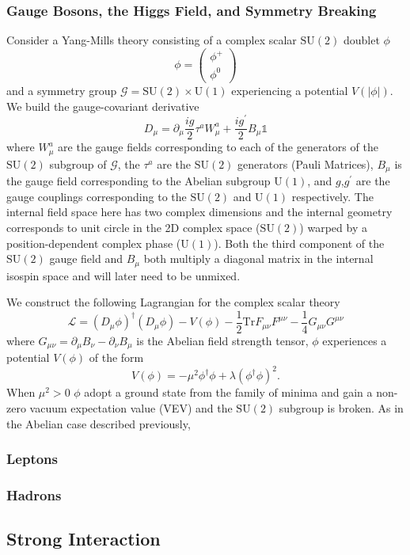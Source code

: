 \subsubsection{Gauge Bosons, the Higgs Field, and Symmetry Breaking}
Consider a Yang-Mills theory consisting of a complex scalar $\mathrm{SU}(2)$ doublet $\phi$ 
\begin{equation}
    \label{eq:theory:higgs_doublet}
    \phi = \begin{pmatrix}
        \phi^{+} \\
        \phi^{0}
    \end{pmatrix}
\end{equation}
and a symmetry group $\mathcal{G}=\mathrm{SU}(2)\times\mathrm{U}(1)$ experiencing a potential $V(|\phi|)$. We build the gauge-covariant derivative 
\begin{equation}
    \label{eq:theory:electroweak_cov_deriv}
    D_{\mu} = \partial_{\mu} \frac{ig}{2}\tau^{a}W_{\mu}^{a} + \frac{ig^{'}}{2}B_{\mu}\mathbb{1}
\end{equation}
where $W_{\mu}^{a}$ are the gauge fields corresponding to each of the generators of the $\mathrm{SU}(2)$ subgroup of $\mathcal{G}$, the $\tau^{a}$ are the $\mathrm{SU}(2)$ generators (Pauli Matrices), $B_{\mu}$ is the gauge field corresponding to the Abelian subgroup $\mathrm{U}(1)$, and $g$,$g^{'}$ are the gauge couplings corresponding to the $\mathrm{SU}(2)$ and $\mathrm{U}(1)$ respectively. 
The internal field space here has two complex dimensions and the internal geometry corresponds to unit circle in the 2D complex space ($\mathrm{SU}(2)$) warped by a position-dependent complex phase ($\mathrm{U}(1)$).
Both the third component of the $\mathrm{SU}(2)$ gauge field and $B_{\mu}$ both multiply a diagonal matrix in the internal isospin space and will later need to be unmixed. 


We construct the following Lagrangian for the complex scalar theory
\begin{equation}
    \label{eq:theory:electroweak_scalar_lagrangian}
    \mathcal{L} = (D_{\mu}\phi)^{\dag}(D_{\mu}\phi) - V(\phi) - \frac{1}{2}\mathrm{Tr}F_{\mu\nu}F^{\mu\nu} - \frac{1}{4}G_{\mu\nu}G^{\mu\nu}
\end{equation}
where $G_{\mu\nu} = \partial_{\mu}B_{\nu} - \partial_{\nu}B_{\mu}$ is the Abelian field strength tensor, $\phi$ experiences a potential $V(\phi)$ of the form
\begin{equation}
    \label{eq:theory:electroweak_higgs_potential}
    V(\phi) = -\mu^{2}\phi^{\dag}\phi + \lambda(\phi^{\dag}\phi)^{2}. 
\end{equation}
When $\mu^{2} > 0$ $\phi$ adopt a ground state from the family of minima and gain a non-zero vacuum expectation value (VEV) and the $\mathrm{SU}(2)$ subgroup is broken. As in the Abelian case described previously, 



\subsubsection{Leptons}

\subsubsection{Hadrons}

\subsection{Strong Interaction}

